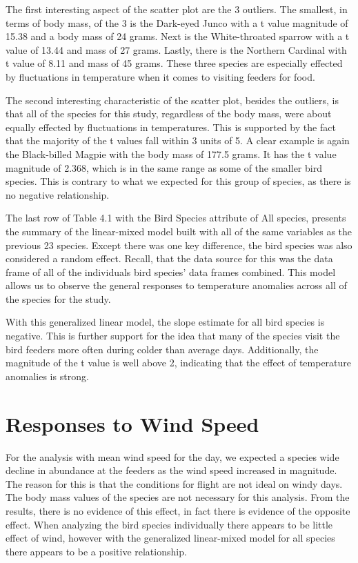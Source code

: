 The first interesting aspect of the scatter plot are the 3 outliers. The smallest, in terms of body mass, of the 3 is the Dark-eyed Junco with a t value magnitude of 15.38 and a body mass of 24 grams. Next is the White-throated sparrow with a t value of 13.44 and mass of 27 grams. Lastly, there is the Northern Cardinal with t value of 8.11 and mass of 45 grams. These three species are especially effected by fluctuations in temperature when it comes to visiting feeders for food.

The second interesting characteristic of the scatter plot, besides the outliers, is that all of the species for this study, regardless of the body mass, were about equally effected by fluctuations in temperatures. This is supported by the fact that the majority of the t values fall within 3 units of 5. A clear example is again the Black-billed Magpie with the body mass of 177.5 grams. It has the t value magnitude of 2.368, which is in the same range as some of the smaller bird species. This is contrary to what we expected for this group of species, as there is no negative relationship.

The last row of Table 4.1 with the Bird Species attribute of All species, presents the summary of the linear-mixed model built with all of the same variables as the previous 23 species. Except there was one key difference, the bird species was also considered a random effect. Recall, that the data source for this was the data frame of all of the individuals bird species' data frames combined. This model allows us to observe the general responses to temperature anomalies across all of the species for the study. 

With this generalized linear model, the slope estimate for all bird species is negative. This is further support for the idea that many of the species visit the bird feeders more often during colder than average days. Additionally, the magnitude of the t value is well above 2, indicating that the effect of temperature anomalies is strong. 

\section{Responses to Wind Speed}

For the analysis with mean wind speed for the day, we expected a species wide decline in abundance at the feeders as the wind speed increased in magnitude. The reason for this is that the conditions for flight are not ideal on windy days. The body mass values of the species are not necessary for this analysis. From the results, there is no evidence of this effect, in fact there is evidence of the opposite effect. When analyzing the bird species individually there appears to be little effect of wind, however with the generalized linear-mixed model for all species there appears to be a positive relationship.

